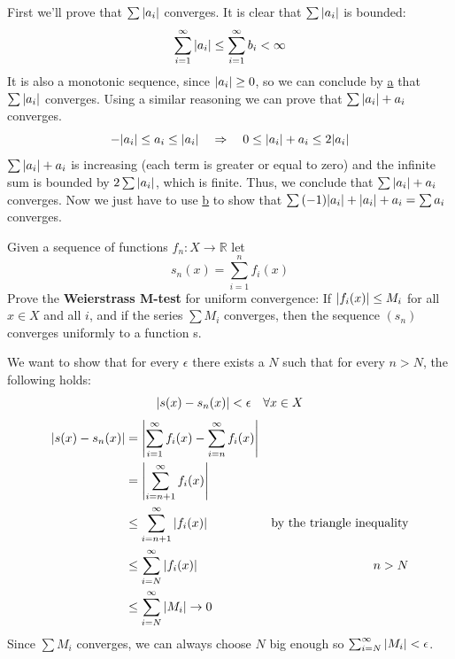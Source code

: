 \documentclass{article}
\def\R{\mathbb{R}}
\DeclarePairedDelimiter\abs{\lvert}{\rvert}%
\begin{document}
    \noindent
    First we'll prove that $\sum{\abs{a_i}}$ converges. It is clear that $\sum{\abs{a_i}}$ is bounded:
    \begin{equation*}
        \sum_{i=1}^\infty{\abs{a_i}} \leq \sum_{i=1}^\infty{b_i} < \infty
    \end{equation*}
    It is also a monotonic sequence, since $\abs{a_i} \geq 0$, so we can conclude by \hyperref[21.11a]{a} that $\sum{\abs{a_i}}$ converges. Using a similar reasoning we can prove that $\sum{\abs{a_i} + a_i}$ converges. 
    \begin{equation*}
        -\abs{a_i} \leq a_i \leq \abs{a_i} \quad \Rightarrow \quad 0 \leq \abs{a_i} + a_i \leq 2\abs{a_i}
    \end{equation*}
    $\sum{\abs{a_i} + a_i}$ is increasing (each term is greater or equal to zero) and the infinite sum is bounded by $2\sum{\abs{a_i}}$, which is finite. Thus, we conclude that $\sum{\abs{a_i} + a_i}$ converges. Now we just have to use \hyperref[21.11b]{b} to show that $\sum{(-1)\abs{a_i} + \abs{a_i} + a_i} = \sum{a_i}$ converges. 
    \begin{tcolorbox}[title=Exercise d]
        Given a sequence of functions $f_n \colon X \to \R$ let
        \begin{equation*}
            s_n(x) = \sum_{i=1}^n{f_i(x)}
        \end{equation*}
        Prove the \textbf{Weierstrass M-test} for uniform convergence: If $\abs{f_i(x)} \leq M_i$ for all $x \in X$ and all $i$, and if the series $\sum{M_i}$ converges, then the sequence $(s_n)$ converges uniformly to a function s.
    \end{tcolorbox}
    \noindent
    We want to show that for every $\epsilon$ there exists a $N$ such that for every $n > N$, the following holds:
    \begin{equation*}
        \abs{s(x) - s_n(x)} < \epsilon \quad \forall x \in X
    \end{equation*}
    \begin{align*}
        \abs{s(x) - s_n(x)} &= \abs*{\sum_{i=1}^\infty{f_i(x)} - \sum_{i=n}^\infty{f_i(x)}} \\
        &= \abs*{\sum_{i=n+1}^\infty{f_i(x)}} \\
        &\leq \sum_{i=n+1}^\infty{\abs{f_i(x)}} & \text{by the triangle inequality} \\
        &\leq \sum_{i=N}^\infty{\abs{f_i(x)}} & n > N \\
        &\leq \sum_{i=N}^\infty{\abs{M_i}} \rightarrow 0
    \end{align*}
    Since $\sum{M_i}$ converges, we can always choose $N$ big enough so $\sum_{i=N}^\infty{\abs{M_i}} < \epsilon$.
    
\end{document}
